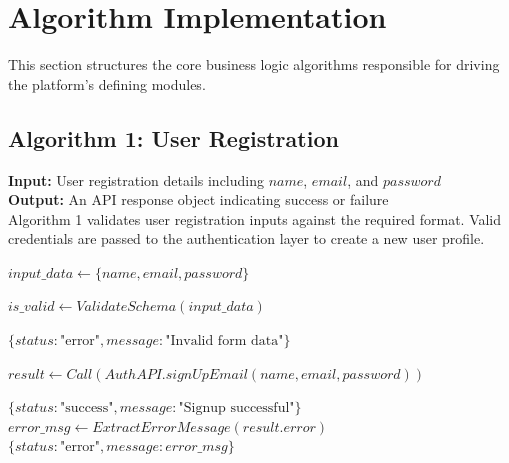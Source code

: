 
\section{Algorithm Implementation}

This section structures the core business logic algorithms responsible for driving the platform's defining modules.

\subsection{Algorithm 1: User Registration}

\textbf{Input:} User registration details including $name$, $email$, and $password$ \\
\textbf{Output:} An API response object indicating success or failure \\

Algorithm 1 validates user registration inputs against the required format. Valid credentials are passed to the authentication layer to create a new user profile.

\begin{algorithm}[H]
\caption{User Registration Process}
\begin{algorithmic}[1]

    \State {}
    \State $input\_data \gets \{name, email, password\}$

    \State {}
    \State $is\_valid \gets ValidateSchema(input\_data)$

        \State \Return $\{status: \text{"error"}, message: \text{"Invalid form data"}\}$
    \EndIf

    \State {}
    \State $result \gets Call(AuthAPI.signUpEmail(name, email, password))$

        \State \Return $\{status: \text{"success"}, message: \text{"Signup successful"}\}$
    \Else
        \State {}
        \State $error\_msg \gets ExtractErrorMessage(result.error)$
        \State \Return $\{status: \text{"error"}, message: error\_msg\}$
    \EndIf

\EndFunction

\end{algorithmic}
\end{algorithm}

